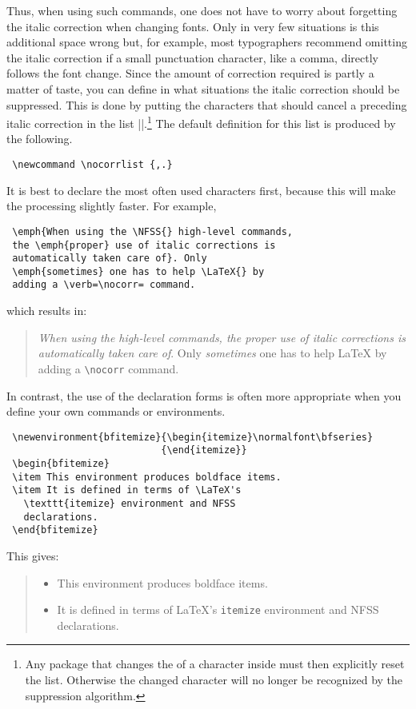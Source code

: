  Thus, when using such commands, one does not have to worry about
 forgetting the italic correction when changing fonts.  Only in very
 few situations is this additional space wrong but, for example, most
 typographers recommend omitting the italic correction if a small
 punctuation character, like a comma, directly follows the font
 change.  Since the amount of correction required is partly a matter
 of taste, you can define in what situations the italic correction
 should be suppressed. This is done by putting the characters that
 should cancel a preceding italic correction in the list
 |\nocorrlist|.\footnote{Any package that changes the
 \texttt{\string\catcode} of a character inside
 \texttt{\string\nocorrlist} must then explicitly reset the list.
 Otherwise the changed character will no longer be recognized
 by the suppression algorithm.}
 The default definition for this list is produced by the following.
 \begin{verbatim}
 \newcommand \nocorrlist {,.}
 \end{verbatim}
 It is best to declare the most often used characters first, because
 this will make the processing slightly faster.  For example,
 \begin{verbatim}
 \emph{When using the \NFSS{} high-level commands,
 the \emph{proper} use of italic corrections is
 automatically taken care of}. Only
 \emph{sometimes} one has to help \LaTeX{} by
 adding a \verb=\nocorr= command.
 \end{verbatim}
 which results in:
 \begin{quote}
 \emph{When using the \NFSS{} high-level commands,
 the \emph{proper} use of italic corrections is
 automatically taken care of}. Only
 \emph{sometimes} one has to help \LaTeX{} by
 adding a \verb=\nocorr= command.
 \end{quote}

 In contrast, the use of the declaration forms is often more
 appropriate when you define your own commands or environments.
 \begin{verbatim}
 \newenvironment{bfitemize}{\begin{itemize}\normalfont\bfseries}
                           {\end{itemize}}
 \begin{bfitemize}
 \item This environment produces boldface items.
 \item It is defined in terms of \LaTeX's
   \texttt{itemize} environment and NFSS
   declarations.
 \end{bfitemize}
 \end{verbatim}
 This gives:
 \begin{quote}
 \newenvironment{bfitemize}
   {\begin{itemize}\normalfont\bfseries}
   {\end{itemize}}
 \begin{bfitemize}
 \item This environment produces boldface items.
 \item It is defined in terms of \LaTeX's
   \texttt{itemize} environment and NFSS
   declarations.
 \end{bfitemize}
 \end{quote}

